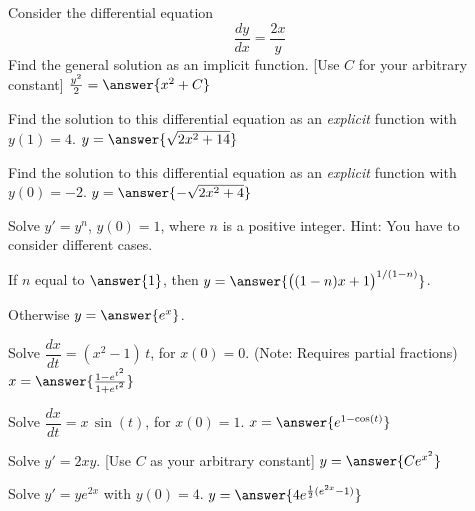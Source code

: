 \documentclass{ximera}
\begin{document}
\begin{exercise}%
    Consider the differential equation 
    \[ 
        \frac{dy}{dx} = \frac{2x}{y} 
    \]
    Find the general solution as an implicit function. [Use $C$ for your arbitrary constant] $\frac{y^2}{2} = \answer{x^2 + C}$
    \begin{problem}
        Find the solution to this differential equation as an \emph{explicit} function with $y(1) = 4$. $y = \answer{\sqrt{2x^2 + 14}}$
        \begin{problem}
            Find the solution to this differential equation as an \emph{explicit} function with $y(0) = -2$. $y = \answer{-\sqrt{2x^2 + 4}}$
        \end{problem}
    \end{problem}
\end{exercise}

\begin{exercise}
    Solve $y' = y^n$, $y(0) = 1$, where $n$ is a positive integer. Hint: You have to consider different cases.
    
    If $n$  equal to $\answer{1}$, then $y=\answer{\bigl((1-n)x+1\bigr)^{1/(1-n)}}$.
    
    Otherwise $y = \answer{e^x}$.
\end{exercise}


\begin{exercise}
    Solve $\dfrac{dx}{dt} = (x^2-1)\,t$, for $x(0) = 0$. (Note: Requires partial fractions) $x = \answer{\frac{1 - e^{t^2}}{1 + e^{t^2}}}$
\end{exercise}

\begin{exercise}
    Solve $\dfrac{dx}{dt} = x\,\sin(t)$, for $x(0) = 1$. $x = \answer{e^{1-\cos(t)}}$
\end{exercise}

\begin{exercise}%
    Solve $y'=2xy$. [Use $C$ as your arbitrary constant] $y = \answer{Ce^{x^2}}$
\end{exercise}

\begin{exercise}
    Solve $y' = ye^{2x}$ with $y(0) = 4$. $y = \answer{4e^{\frac{1}{2}(e^{2x} - 1)}}$
\end{exercise}
\end{document}
